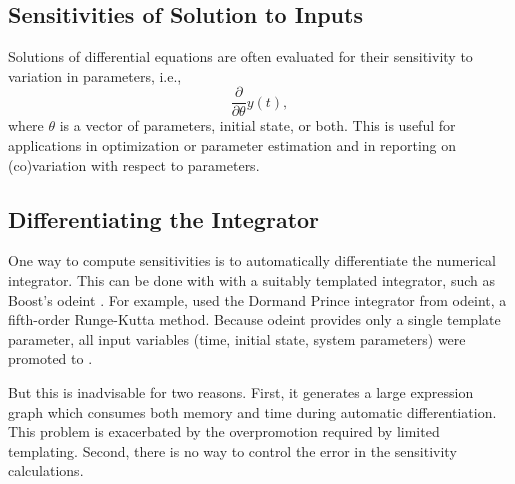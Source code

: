 \documentclass[10pt]{article}
\begin{document}


\subsection{Sensitivities of Solution to Inputs}

Solutions of differential equations are often evaluated for their
sensitivity to variation in parameters, i.e.,
\[
\frac{\partial}{\partial \theta} y(t),
\]
where $\theta$ is a vector of parameters, initial state, or both.
This is useful for applications in optimization or parameter
estimation and in reporting on (co)variation with respect to parameters.


\subsection{Differentiating the Integrator}

One way to compute sensitivities is to automatically differentiate the
numerical integrator.  This can be done with  with a
suitably templated integrator, such as Boost's odeint
\citep{AhnertMulansky:2014}. For example, \citep{WeberEtAl:2014} used
the Dormand Prince integrator from odeint, a fifth-order Runge-Kutta
method.  Because odeint provides only a single template parameter, all
input variables (time, initial state, system parameters) were promoted
to .

But this is inadvisable for two reasons.  First, it generates a large
expression graph which consumes both memory and time during automatic
differentiation.  This problem is exacerbated by the overpromotion
required by limited templating.  Second, there is no way to control
the error in the sensitivity calculations.
\end{document}
